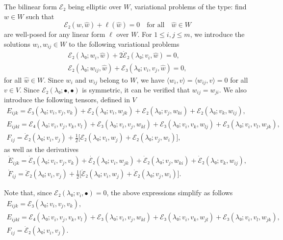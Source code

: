 \documentclass[12pt, final]{scrartcl}
\theoremstyle{definition}
\begin{document}
The bilinear form \(ℰ₂\) being elliptic over \(W\), variational problems of the
type: find \(w ∈ W\) such that
\begin{equation}
  ℰ₂(w, \hat{w})+\ell(\hat{w}) = 0 \quad \text{for all} \quad \hat{w}∈W
\end{equation}
are well-posed for any linear form \(\ell\) over \(W\). For \(1 ≤ i, j ≤ m\), we
introduce the solutions \(w_i, w_{ij} ∈ W\) to the following variational
problems
\begin{gather}
  \label{eq:20220524134525}
  ℰ₂(λ₀; w_i, \hat{w}) + 2\dot{ℰ}₂(λ₀; v_i, \hat{w}) = 0,\\
  \label{eq:20220519164523}
  ℰ₂(λ₀; w_{i j}, \hat{w})+ℰ₃(λ₀; v_i, v_j, \hat{w}) = 0,
\end{gather}
for all \(\hat{w} ∈ W\). Since \(w_{i}\) and \(w_{ij}\) belong to \(W\), we have
\(〈 w_{i}, v 〉 = 〈 w_{ij}, v 〉 = 0\) for all \(v ∈ V\). Since \(ℰ₂(λ₀; •,
•)\) is symmetric, it can be verified that \(w_{ij}=w_{ji}\). We also introduce
the following tensors, defined in \(V\)
\begin{gather}
  E_{ijk} = ℰ₃(λ₀; v_i, v_j, v_k) + ℰ₂(λ₀; v_i, w_{jk}) + ℰ₂(λ₀; v_j, w_{ki}) + ℰ₂(λ₀; v_k, w_{ij}),\\
  E_{ijkl} = ℰ₄(λ₀ ; v_i, v_j, v_k, v_l) + ℰ₃(λ₀ ; v_i, v_j, w_{kl}) + ℰ₃(λ₀ ; v_i, v_k, w_{lj}) + ℰ₃(λ₀ ; v_i, v_l, w_{jk}),\\
  F_{ij} = \dot{ℰ}₂(λ₀; v_i, v_j) + \tfrac{1}{2} \bigl[ℰ₂(λ₀; v_i, w_j) + ℰ₂(λ₀; v_j, w_i)\bigr],
\end{gather}
as well as the derivatives
\begin{gather}
  \label{eq:20220615063626}
  \mathring{E}_{ijk} = \dot{ℰ}₃(λ₀; v_i, v_j, v_k) + \dot{ℰ₂}(λ₀; v_i, w_{jk}) + \dot{ℰ}₂(λ₀; v_j, w_{ki}) + \dot{ℰ}₂(λ₀; v_k, w_{ij}),\\
  \label{eq:20220615063633}
  \mathring{F}_{ij} = \ddot{ℰ}₂(λ₀; v_i, v_j) + \tfrac{1}{2} \bigl[\dot{ℰ}₂(λ₀; v_i, w_j) + \dot{ℰ}₂(λ₀; v_j, w_i)\bigr].
\end{gather}

Note that, since \(ℰ₂(λ₀; v_i, •) = 0\), the above expressions simplify as follows
\begin{gather}
  \label{eq:20220524135619}
  E_{ijk} = ℰ₃(λ₀; v_i, v_j, v_k),\\
  \label{eq:20220524135553}
  E_{ijkl} = ℰ₄(λ₀ ; v_i, v_j, v_k, v_l) + ℰ₃(λ₀ ; v_i, v_j, w_{kl}) + ℰ₃(λ₀ ; v_i, v_k, w_{jl}) + ℰ₃(λ₀ ; v_i, v_l, w_{jk}),\\
  \label{eq:20220524135643}
  F_{ij} = \dot{ℰ}₂(λ₀; v_i, v_j).
\end{gather}
\end{document}
